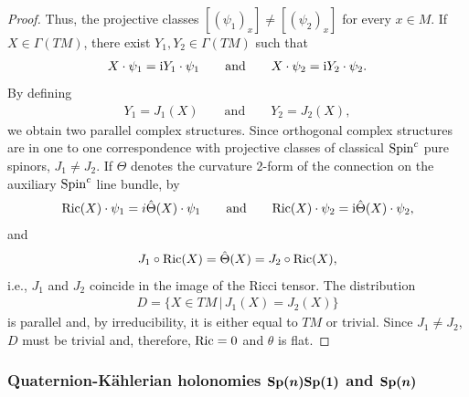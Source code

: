 \documentclass[10pt,a4paper]{amsart}
\numberwithin{equation}{section}
\begin{document}
\begin{proof}
Thus, the projective classes $[(\psi_1)_x]\not=[(\psi_2)_x]$ for every $x\in M$. If $X\in \Gamma(TM)$, there exist $Y_1, Y_2\in \Gamma(TM)$ such that
\begin{gather*}X\cdot \psi_1= {\rm i} Y_1\cdot \psi_1\qquad\text{and}\qquad X\cdot \psi_2= {\rm i} Y_2\cdot \psi_2.
\end{gather*}
By defining
\begin{gather*}Y_1=J_1(X) \qquad\text{and}\qquad Y_2=J_2(X),
\end{gather*}
we obtain two parallel complex structures. Since orthogonal complex structures are in one to one correspondence with projective classes of classical ${\rm Spin}^c$ pure spinors, $J_1\not=J_2$. If $\Theta$ denotes the curvature 2-form of the connection on the auxiliary ${\rm Spin}^c$ line bundle, by~\cite{Moroianu}
\begin{gather*}{\rm Ric}(X)\cdot \psi_1=i\hat\Theta(X)\cdot \psi_1\qquad\text{and}\qquad {\rm Ric}(X)\cdot \psi_2={\rm i}\hat\Theta(X)\cdot \psi_2 ,\end{gather*}
and
\begin{gather*}J_1\circ {\rm Ric}(X) =\hat\Theta(X)=J_2\circ {\rm Ric}(X),\end{gather*}
i.e., $J_1$ and $J_2$ coincide in the image of the Ricci tensor. The distribution
\begin{gather*}D=\{X\in TM\,|\, J_1(X)=J_2(X)\}\end{gather*}
is parallel and, by irreducibility, it is either equal to $TM$ or trivial. Since $J_1\not = J_2$, $D$ must be trivial and, therefore, ${\rm Ric}=0$ and $\theta$ is flat.
\end{proof}

\subsubsection[Quaternion-K\"ahlerian holonomies ${\rm Sp}(n){\rm Sp}(1)$ and ${\rm Sp}(n)$]{Quaternion-K\"ahlerian holonomies $\boldsymbol{{\rm Sp}(n){\rm Sp}(1)}$ and $\boldsymbol{{\rm Sp}(n)}$}
\end{document}
